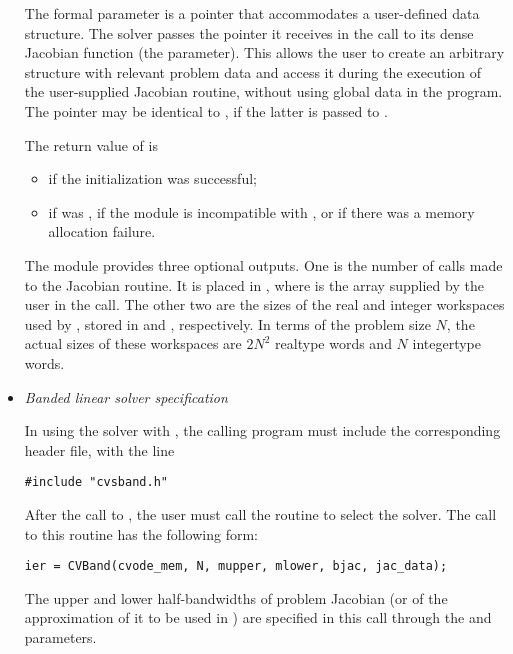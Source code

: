 \begin{itemize}
  The
   formal parameter  is a pointer that
  accommodates a user-defined data structure. The {\cvdense} solver
  passes the pointer it receives in the  call to its dense
  Jacobian function (the  parameter). This allows the user to
  create an arbitrary structure with relevant problem data and access it
  during the execution of the user-supplied Jacobian routine, without
  using global data in the program.  The pointer  may be
  identical to , if the latter is passed to
  .
  
  The return value  of  is
  \begin{itemize}
  \item {}
    if the {\cvdense} initialization was successful;
  \item {}
    if  was , if the {\nvector} module is incompatible 
    with {\cvdense}, or if there was a memory allocation failure.
  \end{itemize}
  
  The {\cvdense} module provides three optional outputs.
  One is the number of calls made to the Jacobian routine. It is placed
  in \id{iopt[}\id{]}, where  is the array supplied by the
  user in the  call.  The other two are the sizes of the
  real and integer workspaces used by {\cvdense}, stored in
  \id{iopt[}\id{]} and \id{iopt[}\id{]},
  respectively.
  In  
  terms of the problem size $N$, the actual sizes of these workspaces are 
  $2N^2$ realtype words and $N$ integertype words.
%
%
\item {\em Banded linear solver specification}
  
  In using the {\cvband} solver with {\cvodes}, the calling program must
  include the corresponding header file, with the line
\begin{verbatim}
#include "cvsband.h"
\end{verbatim}
  \par After the call to , the user must call the routine 
  to select the {\cvband} solver. The call to this routine has the following form:
\begin{verbatim}
ier = CVBand(cvode_mem, N, mupper, mlower, bjac, jac_data);
\end{verbatim}
  The upper and lower half-bandwidths of problem Jacobian (or of the
  approximation of it to be used in {\cvodes}) are specified in this call
  through the  and  parameters.
  

\end{itemize}
